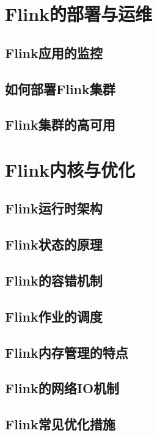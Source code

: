 \documentclass[cn,11pt,chinese]{elegantbook}
\begin{document}
\part{Flink的部署与运维}

\chapter{Flink应用的监控}

\chapter{如何部署Flink集群}

\chapter{Flink集群的高可用}

\part{Flink内核与优化}

\chapter{Flink运行时架构}

\chapter{Flink状态的原理}

\chapter{Flink的容错机制}

\chapter{Flink作业的调度}

\chapter{Flink内存管理的特点}

\chapter{Flink的网络IO机制}

\chapter{Flink常见优化措施}
\end{document}
